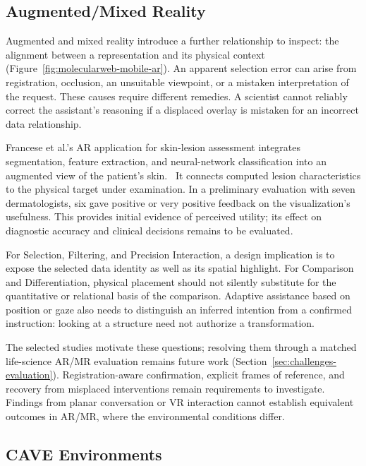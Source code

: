 \subsection{Augmented/Mixed Reality}
\label{sec:modality-ar}

Augmented and mixed reality introduce a further relationship to inspect: the alignment between a representation and its physical context (Figure~\ref{fig:molecularweb-mobile-ar}). An apparent selection error can arise from registration, occlusion, an unsuitable viewpoint, or a mistaken interpretation of the request. These causes require different remedies. A scientist cannot reliably correct the assistant's reasoning if a displaced overlay is mistaken for an incorrect data relationship.



Francese et al.'s AR application for skin-lesion assessment integrates segmentation, feature extraction, and neural-network classification into an augmented view of the patient's skin.~\cite{MapSkinAR} It connects computed lesion characteristics to the physical target under examination. In a preliminary evaluation with seven dermatologists, six gave positive or very positive feedback on the visualization's usefulness. This provides initial evidence of perceived utility; its effect on diagnostic accuracy and clinical decisions remains to be evaluated.

For Selection, Filtering, and Precision Interaction, a design implication is to expose the selected data identity as well as its spatial highlight. For Comparison and Differentiation, physical placement should not silently substitute for the quantitative or relational basis of the comparison. Adaptive assistance based on position or gaze also needs to distinguish an inferred intention from a confirmed instruction: looking at a structure need not authorize a transformation.

The selected studies motivate these questions; resolving them through a matched life-science AR/MR evaluation remains future work (Section~\ref{sec:challenges-evaluation}). Registration-aware confirmation, explicit frames of reference, and recovery from misplaced interventions remain requirements to investigate. Findings from planar conversation or VR interaction cannot establish equivalent outcomes in AR/MR, where the environmental conditions differ.

\subsection{CAVE Environments}
\label{sec:modality-cave}


